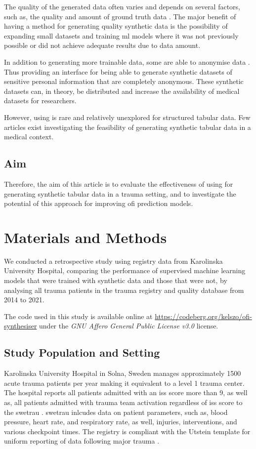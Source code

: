 \documentclass[12pt, letterpaper]{article}
\begin{document}
The quality of the generated data often varies and depends on several factors, such as, the quality and amount of ground truth data \cite{karras_training_2020}. The major benefit of having a method for generating quality synthetic data is the possibility of expanding small datasets and training \acrshort{ml} models where it was not previously possible or did not achieve adequate results due to data amount.

In addition to generating more trainable data, some  are able to anonymise data \cite{liu_ppgan_2019}. Thus providing an interface for being able to generate synthetic datasets of sensitive personal information that are completely anonymous. These synthetic datasets can, in theory, be distributed and increase the availability of medical datasets for researchers.

However, using  is rare and relatively unexplored for structured tabular data. Few articles exist investigating the feasibility of generating synthetic tabular data in a medical context.

\subsection{Aim}
Therefore, the aim of this article is to evaluate the effectiveness of using  for generating synthetic tabular data in a trauma setting, and to investigate the potential of this approach for improving \acrshort{ofi} prediction models.

\section{Materials and Methods}
We conducted a retrospective study using registry data from Karolinska University Hospital, comparing the performance of supervised machine learning models that were trained with synthetic data and those that were not, by analysing all trauma patients in the trauma registry and quality database from 2014 to 2021.

The code used in this study is available online at \url{https://codeberg.org/kelszo/ofi-synthesiser} under the \textit{GNU Affero General Public License v3.0} license.

\subsection{Study Population and Setting}
Karolinska University Hospital in Solna, Sweden manages approximately 1500 acute trauma patients per year making it equivalent to a level 1 trauma center. The hospital reports all patients admitted with an \acrfull{iss} score more than 9, as well as, all patients admitted with trauma team activation regardless of \acrshort{iss} score to the \acrfull{swetrau} \cite{swetrau}. \acrshort{swetrau} inlcudes data on patient parameters, such as, blood pressure, heart rate, and respiratory rate, as well, injuries, interventions, and various checkpoint times. The registry is compliant with the Utstein template for uniform reporting of data following major trauma \cite{ringdal_utstein_2008}.
\end{document}
